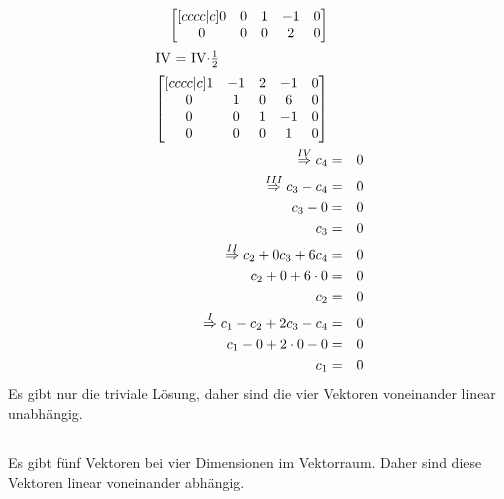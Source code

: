 \documentclass[10pt,a4paper,oneside,ngerman,numbers=noenddot]{scrartcl}
\begin{document}
\begin{alignat*}{2}
\begin{bmatrix}[cccc|c]
0 & 0 & 1 & -1 & 0 \\
0 & 0 & 0 & 2 & 0
\end{bmatrix} \\
\intertext{IV = IV$ \cdot \frac{1}{2}$}
\begin{bmatrix}[cccc|c]
1 & -1 & 2 & -1 & 0 \\
0 & 1 & 0 & 6 & 0 \\
0 & 0 & 1 & -1 & 0 \\
0 & 0 & 0 & 1 & 0
\end{bmatrix} \\
\overset{IV}{\Rightarrow} c_{4} &=& 0 \\
\overset{III}{\Rightarrow} c_{3} - c_{4} &=& 0 \\
c_{3} - 0 &=& 0 \\
c_{3} &=& 0 \\
\overset{II}{\Rightarrow} c_{2} + 0c_{3} + 6c_{4} &=& 0 \\
c_{2} + 0 + 6 \cdot 0 &=& 0 \\
c_{2} &=& 0 \\
\overset{I}{\Rightarrow} c_{1} - c_{2} + 2c_{3} - c_{4} &=& 0 \\
c_{1} - 0 + 2 \cdot 0 - 0 &=& 0 \\
c_{1} &=& 0
\end{alignat*}
Es gibt nur die triviale Lösung, daher sind die vier Vektoren voneinander linear unabhängig.
\subsection{} %
Es gibt fünf Vektoren bei vier Dimensionen im Vektorraum. Daher sind diese Vektoren linear voneinander abhängig.
\end{document}
